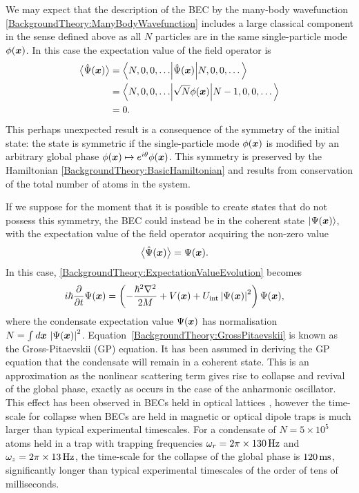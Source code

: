 We may expect that the description of the BEC by the many-body wavefunction \eqref{BackgroundTheory:ManyBodyWavefunction} includes a large classical component in the sense defined above as all $N$ particles are in the same single-particle mode $\phi(\bm{x})$.  In this case the expectation value of the field operator is
\begin{align}
    \mean{\hat{\Psi}(\vect{x})} &= \left<N, 0, 0, \dots \middle| \hat{\Psi}(\vect{x}) \middle| N, 0, 0, \dots \right> \notag \\
    &= \left<N, 0, 0, \dots \middle| \sqrt{N} \phi(\vect{x}) \middle| N - 1, 0, 0, \dots \right> \notag \\
    &= 0. \label{BackgroundTheory:OperatorExpectationValueNumberState}
\end{align}
This perhaps unexpected result is a consequence of the symmetry of the initial state: the state is symmetric if the single-particle mode $\phi(\bm{x})$ is modified by an arbitrary global phase $\phi(\bm{x}) \mapsto e^{i \theta}\phi(\bm{x})$.  This symmetry is preserved by the Hamiltonian \eqref{BackgroundTheory:BasicHamiltonian} and results from conservation of the total number of atoms in the system.

If we suppose for the moment that it is possible to create states that do not possess this symmetry, the BEC could instead be in the coherent state ${\left|\Psi(\bm{x})\right>}$, with the expectation value of the field operator acquiring the non-zero value
\begin{align}
    \mean{\hat{\Psi}(\vect{x})} &= \Psi(\vect{x}). \label{BackgroundTheory:NonZeroMeanField}
\end{align}
In this case, \eqref{BackgroundTheory:ExpectationValueEvolution} becomes
\begin{align}
    i \hbar \frac{\partial}{\partial t} \Psi(\vect{x}) &= \left(- \frac{\hbar^2 \nabla^2}{2 M} + V(\vect{x}) + U_\text{int} \abs{\Psi(\vect{x})}^2 \right) \Psi(\vect{x}), \label{BackgroundTheory:GrossPitaevskii}
\end{align}
where the condensate expectation value $\Psi(\bm{x})$ has normalisation $N = \int d \bm{x}\, \left|\Psi(\bm{x})\right|^2$.  Equation~\eqref{BackgroundTheory:GrossPitaevskii} is known as the Gross-Pitaevskii (GP) equation.  It has been assumed in deriving the GP equation that the condensate will remain in a coherent state.  This is an approximation as the nonlinear scattering term gives rise to collapse and revival of the global phase, exactly as occurs in the case of the anharmonic oscillator.  This effect has been observed in BECs held in optical lattices \citep{Greiner:2002fk}, however the time-scale for collapse when BECs are held in magnetic or optical dipole traps is much larger than typical experimental timescales.  For a  condensate of $N= 5 \times 10^5$ atoms held in a trap with trapping frequencies $\omega_r = 2\pi\times\unit[130]{Hz}$ and $\omega_z = 2\pi \times \unit[13]{Hz}$, the time-scale for the collapse of the global phase is $\unit[120]{ms}$, significantly longer than typical experimental timescales of the order of tens of milliseconds.

